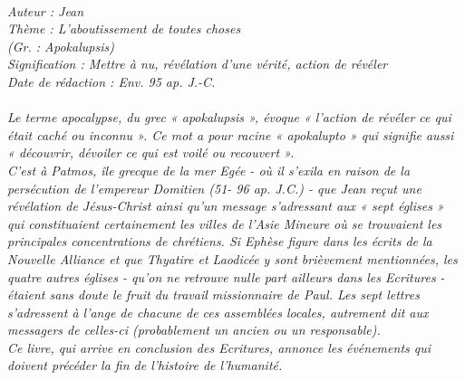\BFont
\noindent\hrulefill
{\footnotesize
\textit{
\bigskip
{\centering{}
\\Auteur : Jean
\\Thème : L'aboutissement de toutes choses
\\(Gr. : Apokalupsis)
\\Signification : Mettre à nu, révélation d'une vérité, action de révéler
\\Date de rédaction : Env. 95 ap. J.-C.\\}
}
\textit{
\\Le terme apocalypse, du grec « apokalupsis », évoque « l'action de révéler ce qui était caché ou inconnu ». Ce mot a pour racine « apokalupto » qui signifie aussi « découvrir, dévoiler ce qui est voilé ou recouvert ».
\\C'est à Patmos, île grecque de la mer Egée - où il s'exila en raison de la persécution de l'empereur Domitien (51- 96 ap. J.C.) - que Jean reçut une révélation de Jésus-Christ ainsi qu'un message s'adressant aux « sept églises » qui constituaient certainement les villes de l'Asie Mineure où se trouvaient les principales concentrations de chrétiens. Si Ephèse figure dans les écrits de la Nouvelle Alliance et que Thyatire et Laodicée y sont brièvement mentionnées, les quatre autres églises - qu'on ne retrouve nulle part ailleurs dans les Ecritures - étaient sans doute le fruit du travail missionnaire de Paul. Les sept lettres s'adressent à l'ange de chacune de ces assemblées locales, autrement dit aux messagers de celles-ci (probablement un ancien ou un responsable).
\\Ce livre, qui arrive en conclusion des Ecritures, annonce les événements qui doivent précéder la fin de l'histoire de l'humanité.\bigskip
}
}
\par\nobreak\noindent\hrulefill
